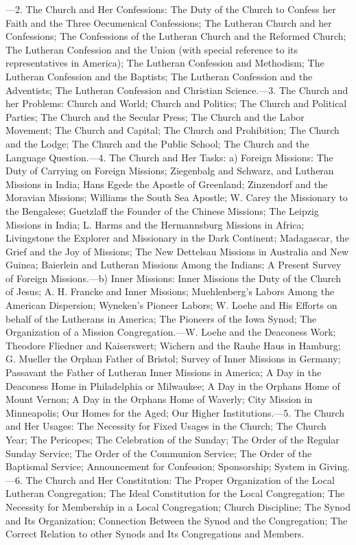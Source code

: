 —2. The Church and Her Confessions: The Duty of the Church to Confess her Faith and the Three Oecumenical Confessions; The Lutheran Church and her Confessions; The Confessions of the Lutheran Church and the Reformed Church; The Lutheran Confession and the Union (with special reference to its representatives in America); The Lutheran Confession and Methodism; The Lutheran Confession and the Baptists; The Lutheran Confession and the Adventists; The Lutheran Confession and Christian Science.—3. The Church and her Problems: Church and World; Church and Politics; The Church and Political
Parties; The Church and the Secular Press; The Church and the Labor Movement; The Church and Capital; The Church and Prohibition; The Church and the Lodge; The Church and the Public School; The Church and the Language Question.—4. The Church and Her Tasks: a) Foreign Missions: The Duty of Carrying on Foreign Missions; Ziegenbalg and Schwarz, and Lutheran Missions in India; Hans Egede the Apostle of Greenland; Zinzendorf and the Moravian Missions; Williams the South Sea Apostle; W. Carey the Missionary to the Bengalese; Guetzlaff the Founder of the Chinese Missions; The Leipzig Missions in India; L. Harms and the Hermannsburg Missions in Africa; Livingstone the Explorer and Missionary in the Dark Continent; Madagascar, the Grief and the Joy of Missions; The New Dettelsau Missions in Australia and New Guinea; Baierlein and Lutheran Missions Among the Indians; A Present Survey of Foreign Missions.—b) Inner Missions: Inner Missions the Duty of the Church of Jesus; A. H. Francke and Inner Missions; Muehlenberg’s Labors Among the American Dispersion; Wyneken’s Pioneer Labors; W. Loehe and His Efforts on behalf of the Lutherans in America; The Pioneers of the Iowa Synod; The Organization of a Mission Congregation.—W. Loehe and the Deaconess Work; Theodore Fliedner and Kaiserswert; Wichern and the Rauhe Haus in Hamburg; G. Mueller the Orphan Father of Bristol; Survey of Inner Missions in Germany; Passavant the Father of Lutheran Inner Missions in America; A Day in the Deaconess Home in Philadelphia or Milwaukee; A Day in the Orphans Home of Mount Vernon; A Day in the Orphans Home of Waverly; City Mission in Minneapolis; Our Homes for the Aged; Our Higher Institutions.—5. The Church and Her Usages: The Necessity for Fixed Usages in the Church; The Church Year; The Pericopes; The Celebration of the Sunday; The Order of the Regular Sunday Service; The Order of the Communion Service; The Order of the Baptismal Service; Announcement for Confession; Sponsorship; System in Giving.—6. The Church and Her Constitution: The Proper Organization of the Local Lutheran Congregation; The Ideal Constitution for the Local Congregation; The Necessity for Membership in a Local Congregation; Church Discipline; The Synod and Its Organization; Connection Between the Synod and the Congregation; The Correct Relation to other Synods and Its Congregations and Members.

